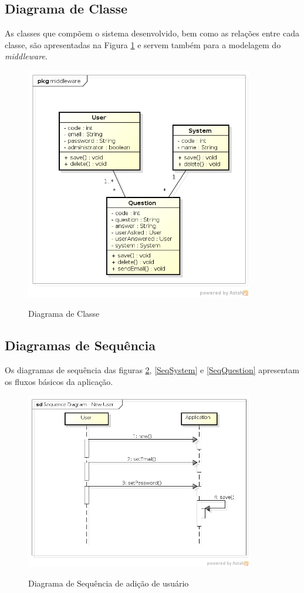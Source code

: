 \subsection{Diagrama de Classe}
	As classes que compõem o sistema desenvolvido, bem como as relações entre cada classe, são apresentadas
	na Figura \ref{Diagrama-Classe} e servem também para a modelagem do \textit{middleware}.
	
	\begin{figure}[!htb]
		\caption{Diagrama de Classe}
		{\parbox{6cm}{
				\includegraphics[width=10cm]{images/ClassDiagram.png}
				\label{Diagrama-Classe}
		}}
	\end{figure}

\subsection{Diagramas de Sequência}
	Os diagramas de sequência das figuras \ref{SeqUser}, \ref{SeqSystem} e \ref{SeqQuestion} apresentam os fluxos básicos da aplicação.
	
	\begin{figure}[!htb]
		\caption{Diagrama de Sequência de adição de usuário}
		{\parbox{6cm}{
				\includegraphics[width=10cm]{images/SequenceDiagramNewUser.png}
				\label{SeqUser}
		}}
	\end{figure}

